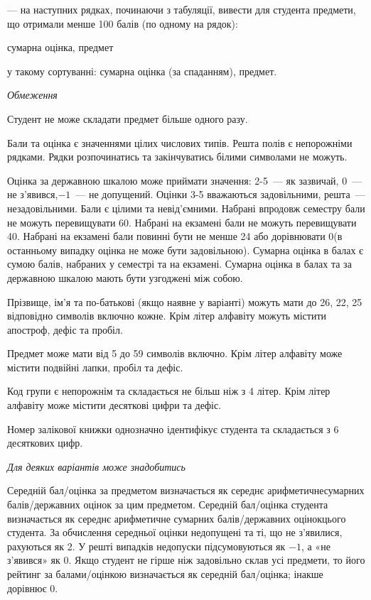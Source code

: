 \documentclass[11pt, ukrainian]{article}
\begin{document}
{\noindent}--- на наступних рядках, починаючи з табуляції, вивести для студента предмети, що отримали менше 100 балів (по одному на рядок):\par
сумарна оцінка, предмет

{\noindent}у такому сортуванні: сумарна оцінка (за спаданням), предмет.


\bigskip\textit{Обмеження}

Студент не може складати предмет більше одного разу.

Бали та оцінка є значеннями цілих числових типів. Решта полів є непорожніми рядками.
Рядки розпочинатись та закінчуватись білими символами не можуть.

Оцінка за державною шкалою може приймати значення: 2-5~--- як зазвичай, 0~--- не з’явився,$-1$~--- не допущений. 
Оцінки 3-5 вважаються задовільними, решта~--- незадовільними. 
Бали є цілими та невід’ємними.
Набрані впродовж семестру бали не можуть перевищувати 60. 
Набрані на екзамені бали не можуть перевищувати 40. 
Набрані на екзамені бали повинні бути не менше 24 або дорівнювати 0(в останньому випадку оцінка не може бути задовільною). 
Сумарна оцінка в балах є сумою балів, набраних у семестрі та на екзамені.
Сумарна оцінка в балах та за державною шкалою мають бути узгоджені між собою.

Прізвище, ім’я та по-батькові (якщо наявне у варіанті) можуть мати до 26, 22, 25 відповідно символів включно кожне. 
Крім літер алфавіту можуть містити апостроф, дефіс та пробіл.

Предмет може мати від 5 до 59 символів включно. 
Крім літер алфавіту може містити подвійні лапки, пробіл та дефіс.

Код групи є непорожнім та складається не більш ніж з 4 літер. 
Крім літер алфавіту може містити десяткові цифри та дефіс.


Номер залікової книжки однозначно ідентифікує студента та складається з 6 десяткових цифр. 

\bigskip\textit{Для деяких варіантів може знадобитись}

Середній бал/оцінка за предметом визначається як середнє арифметичнесумарних балів/державних оцінок за цим предметом. 
Середній бал/оцінка студента визначається як середнє арифметичне сумарних балів/державних оцінокцього студента. 
За обчислення середньої оцінки недопущені та ті, що не з’явилися, рахуються як 2.
У решті випадків недопуски підсумовуються як $-1$, а «не з’явився» як 0.
Якщо студент не гірше ніж задовільно склав усі предмети, 
то його рейтинг за балами/оцінкою визначається як середній бал/оцінка; інакше дорівнює 0.
\end{document}
